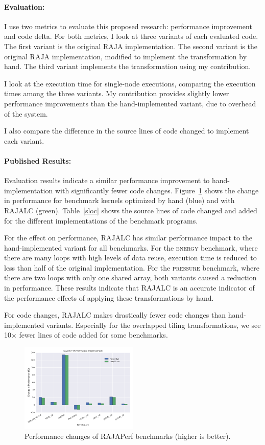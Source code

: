 \documentclass{article}
\begin{document}
\paragraph{Evaluation:}

I use two metrics to evaluate this proposed research: performance improvement and code delta. 
For both metrics, I look at three variants of each evaluated code.
The first variant is the original RAJA implementation. 
The second variant is the original RAJA implementation, modified to implement the transformation by hand.
The third variant implements the transformation using my contribution.

I look at the execution time for single-node executions, comparing the execution times among the three variants. My contribution provides slightly lower performance improvements than the hand-implemented variant, due to overhead of the system.

I also compare the difference in the source lines of code changed to implement each variant.

\paragraph{Published Results:}
Evaluation results indicate a similar performance improvement to hand-implementation with significantly fewer code changes.
Figure~\ref{RAJAPerfPerf} shows the change in performance for benchmark kernels optimized by hand (blue) and with RAJALC (green). 
Table~\ref{sloc} shows the source lines of code changed and added for the different implementations of the benchmark programs.

For the effect on performance, RAJALC has similar performance impact to the hand-implemented variant for all benchmarks. 
For the \textsc{energy} benchmark, where there are many loops with high levels of data reuse, execution time is reduced to less than half of the original implementation.
For the \textsc{pressure} benchmark, where there are two loops with only one shared array, both variants caused a reduction in performance.
These results indicate that RAJALC is an accurate indicator of the performance effects of applying these transformations by hand.

For code changes, RAJALC makes drastically fewer code changes than hand-implemented variants. 
Especially for the overlapped tiling transformations, we see  10$\times$ fewer lines of code added for some benchmarks.
\begin{figure}
    \centering
    \includegraphics[width=0.5\textwidth]{RAJALC-perf-system-1.png}
    \caption{Performance changes of RAJAPerf benchmarks (higher is better).}
    \label{RAJAPerfPerf}
\end{figure}
\end{document}
